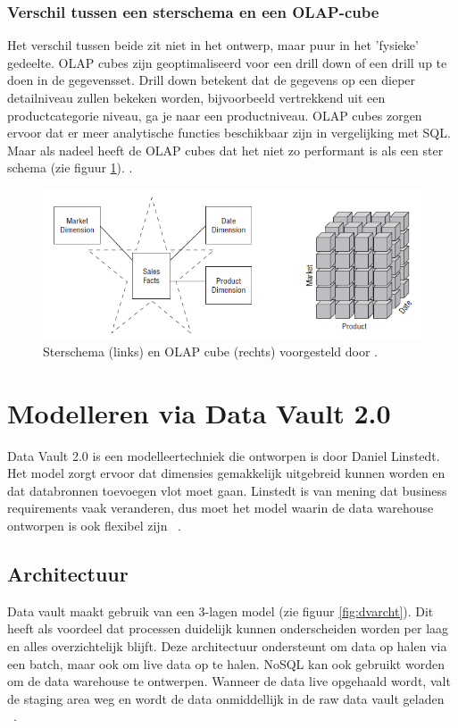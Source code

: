 \subsubsection{Verschil tussen een sterschema en een OLAP-cube}
Het verschil tussen beide zit niet in het ontwerp, maar puur in het 'fysieke' gedeelte.
OLAP cubes zijn geoptimaliseerd voor een drill down of een drill up te doen in de gegevensset.
Drill down betekent dat de gegevens op een dieper detailniveau zullen bekeken worden, bijvoorbeeld vertrekkend uit een productcategorie niveau, ga je naar een productniveau. OLAP cubes zorgen ervoor dat er meer analytische functies beschikbaar zijn in vergelijking met SQL. Maar als nadeel heeft de OLAP cubes dat het niet zo performant is als een ster schema  (zie figuur \ref{fig:stervsolap}).  \autocite{Kimball2013}. 

\begin{figure}[h]
	\includegraphics[scale=0.8]{../images/starvsolap.PNG}
	\caption{Sterschema (links) en OLAP cube (rechts) voorgesteld door \textcite{Kimball2013}.}
	\label{fig:stervsolap}
\end{figure}
\pagebreak
\section{Modelleren via Data Vault 2.0}
Data Vault 2.0 is een modelleertechniek die ontworpen is door Daniel Linstedt. Het model zorgt ervoor dat dimensies gemakkelijk uitgebreid kunnen worden en dat databronnen toevoegen vlot moet gaan. Linstedt is van mening dat business requirements vaak veranderen, dus moet het model waarin de data warehouse ontworpen is ook flexibel zijn 
~\autocite{Linstedt2016}.
\subsection{Architectuur}
Data vault maakt gebruik van een 3-lagen model (zie figuur \ref{fig:dvarcht}). Dit heeft als voordeel dat processen duidelijk kunnen onderscheiden worden per laag en alles overzichtelijk blijft. Deze architectuur ondersteunt om data op halen via een batch, maar ook om live data op te halen. NoSQL kan ook gebruikt worden om de data warehouse te ontwerpen. Wanneer de data live opgehaald wordt, valt de staging area weg en wordt de data onmiddellijk in de raw data vault geladen ~\autocite{Krneta2014}.


